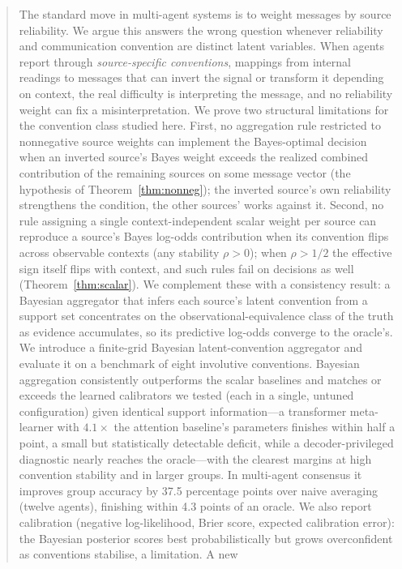 \begin{abstract}
The standard move in multi-agent systems is to weight messages by source
reliability. We argue this answers the wrong question whenever reliability
and communication convention are distinct latent variables. When agents
report through \emph{source-specific conventions}, mappings from internal
readings to messages that can invert the signal or transform it depending
on context, the real difficulty is interpreting the message, and no
reliability weight can fix a misinterpretation. We prove two structural
limitations for the convention class studied here. First, no aggregation
rule restricted to nonnegative source weights can implement the
Bayes-optimal decision when an inverted source's Bayes weight exceeds
the realized combined contribution of the remaining sources on some
message vector (the hypothesis of Theorem~\ref{thm:nonneg}); the
inverted source's own reliability strengthens the condition, the other
sources' works against it. Second, no rule assigning a single
context-independent scalar weight per source can reproduce a source's
Bayes log-odds contribution when its convention flips across
observable contexts (any stability $\rho > 0$); when $\rho > 1/2$ the
effective sign itself flips with context, and such rules fail on
decisions as well (Theorem~\ref{thm:scalar}). We complement these
with a consistency result: a Bayesian aggregator that infers each source's
latent convention from a support set concentrates on the
observational-equivalence class of the truth as evidence accumulates, so
its predictive log-odds converge to the oracle's. We introduce a finite-grid Bayesian
latent-convention aggregator and evaluate it on a benchmark of eight
involutive conventions. Bayesian aggregation consistently outperforms the
scalar baselines and matches or exceeds the learned calibrators we tested
(each in a single, untuned configuration) given identical support
information---a transformer meta-learner with $4.1\times$ the attention
baseline's parameters finishes within half a point, a small but
statistically detectable deficit, while a decoder-privileged diagnostic
nearly reaches the oracle---with the clearest margins at high convention
stability and in larger groups. In multi-agent consensus it improves group accuracy by
37.5 percentage points over naive averaging (twelve agents), finishing
within 4.3 points of an oracle. We also report calibration (negative
log-likelihood, Brier score, expected calibration error): the Bayesian
posterior scores best probabilistically but grows overconfident as
conventions stabilise, a limitation. A new

\end{abstract}
